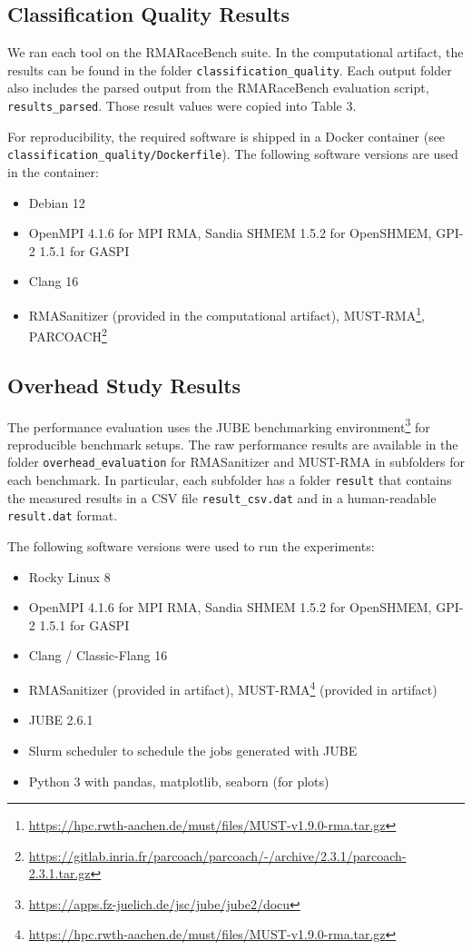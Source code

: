 \documentclass[twoside]{article}
\begin{document}
\subsection*{Classification Quality Results}
We ran each tool on the RMARaceBench suite. 
In the computational artifact, the results can be found in the folder \texttt{classification\_quality}.
Each output folder also includes the parsed output from the RMARaceBench evaluation script, \texttt{results\_parsed}.
Those result values were copied into Table 3.

For reproducibility, the required software is shipped in a Docker container (see \texttt{classification\_quality/Dockerfile}). The following software versions are used in the container:
\begin{itemize}
\item Debian 12
\item OpenMPI 4.1.6 for MPI RMA, Sandia SHMEM 1.5.2 for OpenSHMEM, GPI-2 1.5.1 for GASPI
\item Clang 16
\item RMASanitizer (provided in the computational artifact), MUST-RMA\footnote{\url{https://hpc.rwth-aachen.de/must/files/MUST-v1.9.0-rma.tar.gz}}, PARCOACH\footnote{\url{https://gitlab.inria.fr/parcoach/parcoach/-/archive/2.3.1/parcoach-2.3.1.tar.gz}}
\end{itemize}


\subsection*{Overhead Study Results}
The performance evaluation uses the JUBE benchmarking environment\footnote{\url{https://apps.fz-juelich.de/jsc/jube/jube2/docu}} for reproducible benchmark setups.
The raw performance results are available in the folder \texttt{overhead\_evaluation} for RMASanitizer and MUST-RMA in subfolders for each benchmark. In particular, each subfolder has a folder  \texttt{result} that contains the measured results in a CSV file \texttt{result\_csv.dat} and in a human-readable \texttt{result.dat} format.

The following software versions were used to run the experiments:
\begin{itemize}
\item Rocky Linux 8
\item OpenMPI 4.1.6 for MPI RMA, Sandia SHMEM 1.5.2 for OpenSHMEM, GPI-2 1.5.1 for GASPI
\item Clang / Classic-Flang 16
\item RMASanitizer (provided in artifact), MUST-RMA\footnote{\url{https://hpc.rwth-aachen.de/must/files/MUST-v1.9.0-rma.tar.gz}} (provided in artifact)
\item JUBE 2.6.1
\item Slurm scheduler to schedule the jobs generated with JUBE
\item Python 3 with pandas, matplotlib, seaborn (for plots)
\end{itemize}
\end{document}
